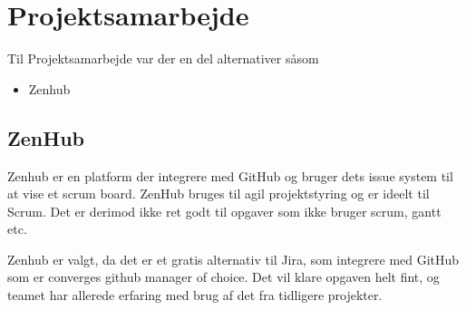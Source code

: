 \section{Projektsamarbejde}

Til Projektsamarbejde var der en del alternativer såsom

\begin{itemize}
    \item Zenhub
\end{itemize}

\subsection{ZenHub}

Zenhub er en platform der integrere med GitHub og bruger dets issue system til at vise et scrum board. ZenHub bruges til agil projektstyring og er ideelt til Scrum. Det er derimod ikke ret godt til opgaver som ikke bruger scrum, gantt etc.

Zenhub er valgt, da det er et gratis alternativ til Jira, som integrere med GitHub som er converges github manager of choice. Det vil klare opgaven helt fint, og teamet har allerede erfaring med brug af det fra tidligere projekter.



